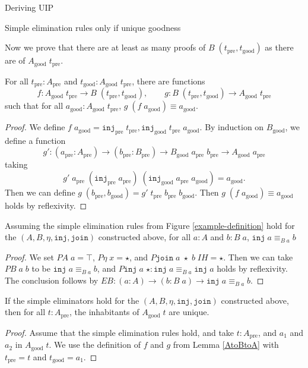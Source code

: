 \documentclass[acmsmall,review]{acmart}\settopmatter{printfolios=true,printccs=false,printacmref=false}
\newcommand{\pre}[1]{{#1}_\text{pre}}
\newcommand{\good}[1]{{#1}_\text{good}}
\newcommand{\Id}[2]{{#1}\equiv{#2}}
\newcommand{\IdA}[3]{{#1}\equiv_{#3}{#2}}
\newcommand{\join}{\texttt{join}}
\newcommand{\inj}{\texttt{inj}}
\begin{document}
\begin{section}{Deriving UIP}
\begin{subsection}{Simple elimination rules only if unique goodness}

Now we prove that there are at least as many proofs of $B\;(\pre{t},\good{t})$ as there are of $\good{A}\;\pre{t}$.

\begin{lemma}[$\good{A}$ is a retract of $B$]\label{AtoBtoA}
    For all $\pre{t} : \pre{A}$ and $\good{t} : \good{A}\;\pre{t}$, there are functions \[f : \good{A}\;\pre{t} \to B\;(\pre{t},\good{t}),\qquad g : B\;(\pre{t},\good{t})\to \good{A}\;\pre{t}\] such that for all $\good{a} : \good{A}\;\pre{t}$, $\Id{g\;(f\;\good{a})}{\good{a}}$.
\end{lemma}
\begin{proof}
    We define $f\;\good{a} = \pre{\inj}\;\pre{t}, \good{\inj}\;\pre{t}\;\good{a}$.
    By induction on $\good{B}$, we define a function \[g' : (\pre{a} : \pre{A})\to(\pre{b}: \pre{B})\to\good{B}\;\pre{a}\;\pre{b}\to \good{A}\;\pre{a}\] taking \[g'\;\pre{a}\;(\pre{\inj}\;\pre{a})\;(\good{\inj}\;\pre{a}\;\good{a}) = \good{a}.\]
    Then we can define $g\;(\pre{b},\good{b}) = g'\;\pre{t}\;\pre{b}\;\good{b}$.
    Then $\Id{g\;(f\;\good{a})}{\good{a}}$ holds by reflexivity.
\end{proof}

\begin{lemma}[$B$ is contractible]\label{Bcontr}
    Assuming the simple elimination rules from Figure \ref{example-definition} hold for the $(A, B, \eta, \inj, \join)$ constructed above, for all $a : A$ and $b : B\;a$, $\IdA{\inj\;a}{b}{B\;a}$
\end{lemma}
\begin{proof}
    We set $PA\;a = \top$, $P\eta\;x = \star$, and $P\join\;a\;\star\;b\;IH = \star$.
    Then we can take $PB\;a\;b$ to be $\IdA{\inj\;a}{b}{B\;a}$, and $P\inj\; a\;\star : \IdA{\inj\;a}{\inj\;a}{B\;a}$ holds by reflexivity. The conclusion follows by $EB : (a : A) \to (b : B\;a) \to \IdA{\inj\;a}{b}{B\;a}$.
\end{proof}

\begin{lemma}
    If the simple eliminators hold for the $(A,B,\eta,\inj,\join)$ constructed above, then for all $t : \pre{A}$, the inhabitants of $\good{A}\;t$ are unique.
\end{lemma}
\begin{proof}
    Assume that the simple elimination rules hold, and take $t : \pre{A}$, and $a_1$ and $a_2$ in $\good{A}\;t$. We use the definition of $f$ and $g$ from Lemma \ref{AtoBtoA} with $\pre{t} = t$ and $\good{t} = a_1$.
    

\end{proof}
\end{subsection}
\end{section}
\end{document}
